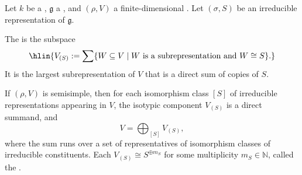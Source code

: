 \begin{definition} \label{definition:isotypic_component_of_a_representation_of_a_lie_algebra_over_a_field_for_an_irreducible_representation}

    Let $k$ be a , $\mathfrak{g}$ a , and $(\rho, V)$ a finite-dimensional . Let $(\sigma, S)$ be an irreducible representation of $\mathfrak{g}$.

    The  is the subspace
    $$\hlin{V_{(S)} := \sum \{W \subseteq V \mid W \text{ is a subrepresentation and } W \cong S\}.}$$
    It is the largest subrepresentation of $V$ that is a direct sum of copies of $S$.

    If $(\rho, V)$ is semisimple, then for each isomorphism class $[S]$ of irreducible representations appearing in $V$, the isotypic component $V_{(S)}$ is a direct summand, and
    $$ V = \bigoplus_{[S]} V_{(S)},$$
    where the sum runs over a set of representatives of isomorphism classes of irreducible constituents. Each $V_{(S)} \cong S^{\oplus m_S}$ for some multiplicity $m_S \in \mathbb{N}$, called the .
\end{definition}
